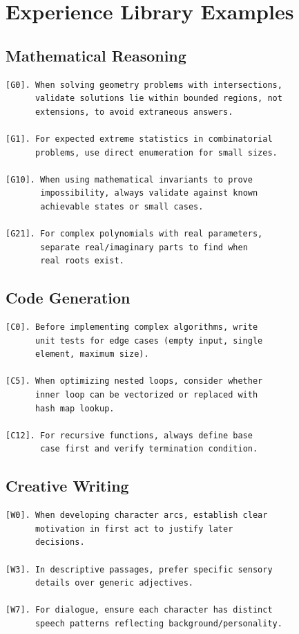 \section{Experience Library Examples}


\subsection{Mathematical Reasoning}

\begin{verbatim}
[G0]. When solving geometry problems with intersections,
      validate solutions lie within bounded regions, not
      extensions, to avoid extraneous answers.

[G1]. For expected extreme statistics in combinatorial
      problems, use direct enumeration for small sizes.

[G10]. When using mathematical invariants to prove
       impossibility, always validate against known
       achievable states or small cases.

[G21]. For complex polynomials with real parameters,
       separate real/imaginary parts to find when
       real roots exist.
\end{verbatim}

\subsection{Code Generation}

\begin{verbatim}
[C0]. Before implementing complex algorithms, write
      unit tests for edge cases (empty input, single
      element, maximum size).

[C5]. When optimizing nested loops, consider whether
      inner loop can be vectorized or replaced with
      hash map lookup.

[C12]. For recursive functions, always define base
       case first and verify termination condition.
\end{verbatim}

\subsection{Creative Writing}

\begin{verbatim}
[W0]. When developing character arcs, establish clear
      motivation in first act to justify later
      decisions.

[W3]. In descriptive passages, prefer specific sensory
      details over generic adjectives.

[W7]. For dialogue, ensure each character has distinct
      speech patterns reflecting background/personality.
\end{verbatim}

